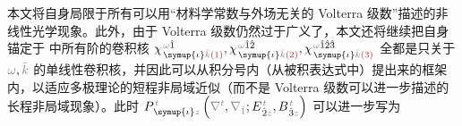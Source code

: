 本文将自身局限于所有可以用“材料学常数与外场无关的 Volterra 级数\cite{pintoExactVolterraseriesComputation1982,shenNonlinearOpticalSusceptibilities2001}”描述的非线性光学现象。此外，由于 Volterra 级数仍然过于广义了，本文还将继续把自身锚定于  中所有阶的卷积核 $\chi^{\;\! \mathcolor{gray}{\omega} \hat{1}}_{\;\! \symup{\iota} \mathcolor{gray}{\bar{k}} \textcolor{Maroon}{(1)}}, \chi^{\;\! \mathcolor{gray}{\omega} \hat{1} \hat{2}}_{\;\! \symup{\iota} \mathcolor{gray}{\bar{k}} \textcolor{Maroon}{(2)}}, \chi^{\;\! \mathcolor{gray}{\omega} \hat{1} \hat{2} \hat{3}}_{\;\! \symup{\iota} \mathcolor{gray}{\bar{k}} \textcolor{Maroon}{(3)}}$ 全都是只关于 $\mathcolor{gray}{\omega}, \mathcolor{gray}{\bar{k}}$ 的单线性卷积核，并因此可以从积分号内（从被积表达式中）提出来的框架内，以适应多极理论的短程非局域近似（而不是 Volterra 级数可以进一步描述的长程非局域现象）。此时 $P^{\;\!\mathcolor{gray}{t}}_{\;\! \symup{\iota}\mathcolor{gray}{z}} \left( \mathcolor{gray}{\nabla^t}, \mathcolor{gray}{\nabla_{\hat{1}}} ; E^{\;\!\mathcolor{gray}{t}}_{\;\! \hat{2}\mathcolor{gray}{z}}, B^{\;\!\mathcolor{gray}{t}}_{\;\! \hat{3}\mathcolor{gray}{z}} \right)$ 可以进一步写为\cite{teixeiraOpticalTransmissionModeling2013,andreasczylwikNonlinearSystemModeling1986,shenNonlinearOpticalSusceptibilities2001,zalevskyOpticalImplementationSecondorder2001,zhangNonlinearQuantumInputoutput2014}
